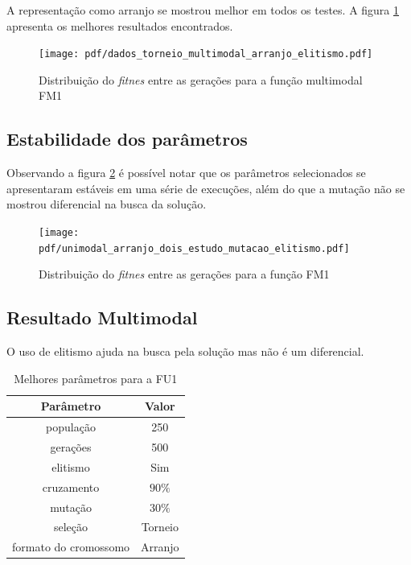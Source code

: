 \documentclass[conference]{IEEEtran}
\begin{document}
A representação como arranjo se mostrou melhor em todos os testes. A figura \ref{fig:multimodal:melhor} apresenta os melhores resultados encontrados.

\begin{figure}[th]
        \centering
        \texttt{[image: pdf/dados\_torneio\_multimodal\_arranjo\_elitismo.pdf]}
        \caption{Distribuição do \textit{fitnes} entre as gerações para a função multimodal FM1}
        \label{fig:multimodal:melhor}
\end{figure}

\subsection{Estabilidade dos parâmetros}

Observando a figura \ref{fig:multimodal:estabilidade} é possível notar que os parâmetros selecionados se apresentaram estáveis em uma série de execuções, além do que a mutação não se mostrou diferencial na busca da solução.

\begin{figure}[th]
        \centering
        \texttt{[image: pdf/unimodal\_arranjo\_dois\_estudo\_mutacao\_elitismo.pdf]}
        \caption{Distribuição do \textit{fitnes} entre as gerações para a função FM1}
        \label{fig:multimodal:estabilidade}
\end{figure}


\subsection{Resultado Multimodal}

O uso de elitismo ajuda na busca pela solução mas não é um diferencial.

\begin{table}[h]
\renewcommand{\arraystretch}{1.3}
\caption{Melhores parâmetros para a FU1}
\label{tab:melhor_parametros_multimodal}
\centering
\begin{tabular}{c|c}
\hline
Parâmetro & Valor\\
\hline
população & 250 \\
gerações & 500 \\
elitismo & Sim \\
cruzamento & $90\%$ \\
mutação & $30\%$ \\
seleção & Torneio \\
formato do cromossomo & Arranjo \\
\end{tabular}
\end{table}
\end{document}
